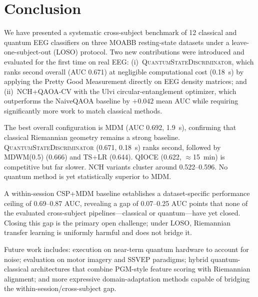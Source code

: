 \documentclass{article}
\begin{document}
\section{Conclusion}
\label{sec:conclusion}

We have presented a systematic cross-subject benchmark of 12 classical and
quantum EEG classifiers on three MOABB resting-state datasets under a
leave-one-subject-out (LOSO) protocol.  Two new contributions were introduced
and evaluated for the first time on real EEG:
(i)~\textsc{QuantumStateDiscriminator}, which ranks second overall (AUC 0.671)
at negligible computational cost (0.18~s) by applying the Pretty Good
Measurement directly on EEG density matrices; and
(ii)~NCH+QAOA-CV with the Ulvi circular-entanglement optimizer, which
outperforms the NaiveQAOA baseline by $+0.042$ mean AUC while requiring
significantly more work to match classical methods.

The best overall configuration is MDM (AUC 0.692, 1.9~s), confirming
that classical Riemannian geometry remains a strong baseline.
\textsc{QuantumStateDiscriminator} (0.671, 0.18~s) ranks second, followed by
MDWM(0.5) (0.666) and TS+LR (0.644).  QIOCE (0.622, $\approx$15~min) is
competitive but far slower.
NCH variants cluster around 0.522--0.596.
No quantum method is yet statistically superior to MDM.

A within-session CSP+MDM baseline establishes a dataset-specific performance
ceiling of 0.69--0.87 AUC, revealing a gap of 0.07--0.25 AUC points that
none of the evaluated cross-subject pipelines---classical or quantum---have
yet closed.  Closing this gap is the primary open challenge; under LOSO,
Riemannian transfer learning is uniformly harmful and does not bridge it.

Future work includes: execution on near-term quantum hardware to account for
noise; evaluation on motor imagery and SSVEP paradigms; hybrid
quantum-classical architectures that combine PGM-style feature scoring with
Riemannian alignment; and more expressive domain-adaptation methods capable
of bridging the within-session/cross-subject gap.




\end{document}
